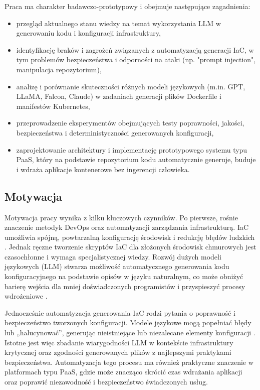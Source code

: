 Praca ma charakter badawczo-prototypowy i obejmuje następujące zagadnienia:
\begin{itemize}
\item przegląd aktualnego stanu wiedzy na temat wykorzystania LLM w generowaniu kodu i konfiguracji infrastruktury,
\item identyfikację braków i zagrożeń związanych z automatyzacją generacji IaC, w tym problemów bezpieczeństwa i odporności na ataki (np. "prompt injection", manipulacja repozytorium),
\item analizę i porównanie skuteczności różnych modeli językowych (m.in. GPT, LLaMA, Falcon, Claude) w zadaniach generacji plików Dockerfile i manifestów Kubernetes,
\item przeprowadzenie eksperymentów obejmujących testy poprawności, jakości, bezpieczeństwa i deterministyczności generowanych konfiguracji,
\item zaprojektowanie architektury i implementację prototypowego systemu typu PaaS, który na podstawie repozytorium kodu automatycznie generuje, buduje i wdraża aplikacje kontenerowe bez ingerencji człowieka.
\end{itemize}

\subsection{Motywacja}

Motywacja pracy wynika z kilku kluczowych czynników. Po pierwsze, rośnie znaczenie metodyk DevOps oraz automatyzacji zarządzania infrastrukturą. IaC umożliwia spójną, powtarzalną konfigurację środowisk i redukcję błędów ludzkich \cite{low_repairing_2024}. Jednak ręczne tworzenie skryptów IaC dla złożonych środowisk chmurowych jest czasochłonne i wymaga specjalistycznej wiedzy. Rozwój dużych modeli językowych (LLM) stwarza możliwość automatycznego generowania kodu konfiguracyjnego na podstawie opisów w języku naturalnym, co może obniżyć barierę wejścia dla mniej doświadczonych programistów i przyspieszyć procesy wdrożeniowe \cite{hu_llm-based_2025}.

Jednocześnie automatyzacja generowania IaC rodzi pytania o poprawność i bezpieczeństwo tworzonych konfiguracji. Modele językowe mogą popełniać błędy lub „halucynować”, generując nieistniejące lub niezalecane elementy konfiguracji \cite{malul_genkubesec_2024}. Istotne jest więc zbadanie wiarygodności LLM w kontekście infrastruktury krytycznej oraz zgodności generowanych plików z najlepszymi praktykami bezpieczeństwa. Automatyzacja tego procesu ma również praktyczne znaczenie w platformach typu PaaS, gdzie może znacząco skrócić czas wdrażania aplikacji oraz poprawić niezawodność i bezpieczeństwo świadczonych usług.

